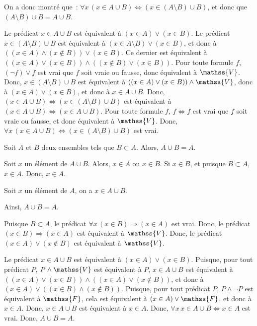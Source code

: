    On a donc montré que : $\forall x \, (x \in A \cup B) \Leftrightarrow (x \in (A \setminus B) \cup B)$, et donc que $(A \setminus B) \cup B = A \cup B$.

    \done

\blank[medium]

\noindent{} 
    Le prédicat $x \in A \cup B$ est équivalent à $(x \in A) \vee (x \in B)$.
    Le prédicat $x \in (A \setminus B) \cup B$ est équivalent à $(x \in A \setminus B) \vee (x \in B)$, et donc à $((x \in A) \wedge (x \notin B)) \vee (x \in B)$.
    Ce dernier est équivalent à $((x \in A) \vee (x \in B)) \wedge ((x \notin B) \vee (x \in B))$.
    Pour toute formule $f$, $(\lnot f) \vee f$ est vrai que $f$ soit vraie ou fausse, donc équivalent à $\mathss{V}$.
    Donc, $x \in (A \setminus B) \cup B$ est équivalent à $((x \in A) \vee (x \in B)) \wedge \mathss{V}$, donc à $(x \in A) \vee (x \in B)$, et donc à $x \in A \cup B$.
    Donc, $(x \in A \cup B) \Leftrightarrow (x \in (A \setminus B) \cup B)$ est équivalent à $(x \in A \cup B) \Leftrightarrow (x \in A \cup B)$.
    Pour toute formule $f$, $f \Leftrightarrow f$ est vrai que $f$ soit vraie ou fausse, et donc équivalent à $\mathss{V}$.
    Donc, $\forall x \, (x \in A \cup B) \Leftrightarrow (x \in (A \setminus B) \cup B)$ est vrai.

\done

\blank[medium]

\noindent{} Soit $A$ et $B$ deux ensembles tels que $B \subset A$.
    Alors, $A \cup B = A$.

\blank[medium]

\noindent{}
    Soit $x$ un élément de $A \cup B$. 
    Alors, $x \in A$ ou $x \in B$.
    Si $x \in B$, et puisque $B \subset A$, $x \in A$.
    Donc, $x \in A$.

    Soit $x$ un élément de $A$, on a $x \in A \cup B$.

    Ainsi, $A \cup B = A$.

    \done

\blank[medium]

\noindent{} 
    Puisque $B \subset A$, le prédicat $\forall x \, (x \in B) \Rightarrow (x \in A)$ est vrai.
    Donc, le prédicat $(x \in B) \Rightarrow (x \in A)$ est équivalent à $\mathss{V}$.
    Donc, le prédicat $(x \in A) \vee (x \notin B)$ est équivalent à $\mathss{V}$.
    
    Le prédicat $x \in A \cup B$ est équivalent à $(x \in A) \vee (x \in B)$.
    Puisque, pour tout prédicat $P$, $P \wedge \mathss{V}$ est équivalent à $P$, $x \in A \cup B$ est équivalent à $((x \in A) \vee (x \in B)) \wedge ((x \in A) \vee (x \notin B))$, et donc à $(x \in A) \vee ((x \in B) \wedge (x \notin B))$.
    Puisque, pour tout prédicat $P$, $P \wedge \lnot P$ est équivalent à $\mathss{F}$, cela est équivalent à $(x \in A) \vee \mathss{F}$, et donc à $x \in A$.
    Donc, $x \in A \cup B$ est équivalent à $x \in A$.
    Donc, $\forall x \, x \in A \cup B \Leftrightarrow x \in A$ est vrai.
    Donc, $A \cup B = A$.

